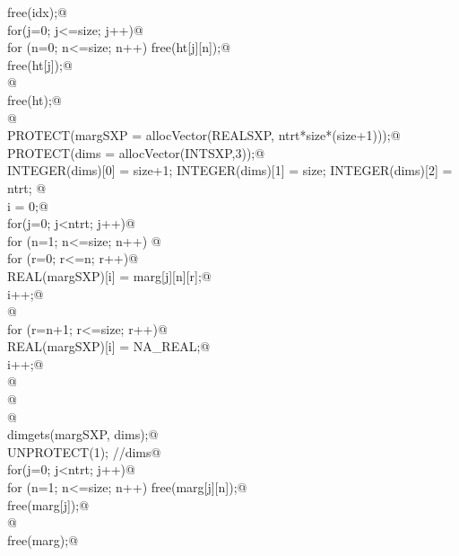 \documentclass[reqno]{amsart}
\begin{document}
\begin{flushleft}
\begin{list}{}{}
\mbox{}\verb@ free(idx);@\\
\mbox{}\verb@ for(j=0; j<=size; j++){@\\
\mbox{}\verb@          for (n=0; n<=size; n++) free(ht[j][n]);@\\
\mbox{}\verb@          free(ht[j]);@\\
\mbox{}\verb@  }@\\
\mbox{}\verb@ free(ht);@\\
\mbox{}\verb@ @\\
\mbox{}\verb@ PROTECT(margSXP = allocVector(REALSXP, ntrt*size*(size+1)));@\\
\mbox{}\verb@ PROTECT(dims = allocVector(INTSXP,3));@\\
\mbox{}\verb@    INTEGER(dims)[0] = size+1;     INTEGER(dims)[1] = size;     INTEGER(dims)[2] = ntrt;   @\\
\mbox{}\verb@    i = 0;@\\
\mbox{}\verb@    for(j=0; j<ntrt; j++){@\\
\mbox{}\verb@          for (n=1; n<=size; n++){ @\\
\mbox{}\verb@                  for (r=0; r<=n; r++){@\\
\mbox{}\verb@                          REAL(margSXP)[i] = marg[j][n][r];@\\
\mbox{}\verb@                          i++;@\\
\mbox{}\verb@                  }@\\
\mbox{}\verb@                  for (r=n+1; r<=size; r++){@\\
\mbox{}\verb@                          REAL(margSXP)[i] = NA_REAL;@\\
\mbox{}\verb@                          i++;@\\
\mbox{}\verb@                  }@\\
\mbox{}\verb@          }@\\
\mbox{}\verb@   }@\\
\mbox{}\verb@ dimgets(margSXP, dims);@\\
\mbox{}\verb@ UNPROTECT(1);    //dims@\\
\mbox{}\verb@ for(j=0; j<ntrt; j++){@\\
\mbox{}\verb@          for (n=1; n<=size; n++) free(marg[j][n]);@\\
\mbox{}\verb@          free(marg[j]);@\\
\mbox{}\verb@  }@\\
\mbox{}\verb@ free(marg);@\\
\mbox{}\verb@@\\

\end{list}
\end{flushleft}
\end{document}
